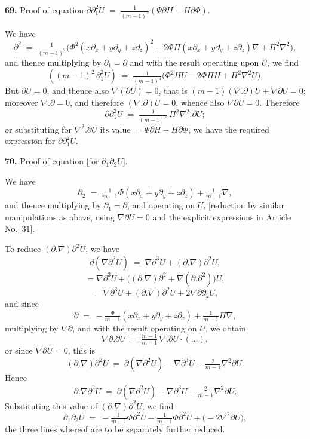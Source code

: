 \documentclass[11pt,a4paper]{article}
\begin{document}
\medskip

\textbf{69.} Proof of equation $\partial\partial_1^2 U \;=\; \tfrac{1}{(m-1)^2}(\Psi\partial H - H\partial\Phi).$

We have
\[
\partial^2 \;=\; \tfrac{1}{(m-1)^2}\bigl(\Phi^2(x\partial_x + y\partial_y + z\partial_z)^2 - 2\Phi\Pi(x\partial_x + y\partial_y + z\partial_z)\nabla + \Pi^2\nabla^2\bigr),
\]
and thence multiplying by $\partial_1 = \partial$ and with the result operating upon $U$, we find
\[
((m-1)^2\,\partial_1^2 U) \;=\; \tfrac{1}{(m-1)^4}\bigl(\Phi^2 H U - 2\Phi\Pi H + \Pi^2\nabla^2 U\bigr).
\]
But $\partial U = 0$, and thence also $\nabla(\partial U) = 0$, that is $(m-1)(\nabla.\partial)U + \nabla\partial U = 0$; moreover $\nabla.\partial = 0$, and therefore $(\nabla.\partial)U = 0$, whence also $\nabla\partial U = 0$. Therefore
\[
\partial\partial_1^2 U \;=\; \tfrac{1}{(m-1)^2}\,\Pi^2\nabla^2.\partial U;
\]
or substituting for $\nabla^2.\partial U$ its value $= \Psi\partial H - H\partial\Phi$, we have the required expression for $\partial\partial_1^2 U$.

\medskip

\textbf{70.} Proof of equation [for $\partial_1\partial_2 U$].

We have
\[
\partial_2 \;=\; \tfrac{1}{m-1}\Phi(x\partial_x + y\partial_y + z\partial_z) + \tfrac{1}{m-1}\nabla,
\]
and thence multiplying by $\partial_1 = \partial$, and operating on $U$,
[reduction by similar manipulations as above, using $\nabla\partial U = 0$ and the explicit expressions in Article No.~31].

To reduce $(\partial.\nabla)\partial^2 U$, we have
\[
\partial(\nabla\partial^2 U) \;=\; \nabla\partial^3 U + (\partial.\nabla)\partial^2 U,
\]
\[
= \nabla\partial^3 U + \bigl((\partial.\nabla)\partial^2 + \nabla(\partial.\partial^2)\bigr)U,
\]
\[
= \nabla\partial^3 U + (\partial.\nabla)\partial^2 U + 2\nabla\partial\partial_2 U,
\]
and since
\[
\partial \;=\; -\tfrac{\Phi}{m-1}(x\partial_x + y\partial_y + z\partial_z) + \tfrac{1}{m-1}\Pi\nabla,
\]
multiplying by $\nabla\partial$, and with the result operating on $U$, we obtain
\[
\nabla\partial.\partial U \;=\; \tfrac{m-1}{m-1}\,\nabla.\partial U\cdot(\ldots),
\]
or since $\nabla\partial U = 0$, this is
\[
(\partial.\nabla)\partial^2 U \;=\; \partial(\nabla\partial^2 U) - \nabla\partial^3 U - \tfrac{2}{m-1}\nabla^2\partial U.
\]
Hence
\[
\partial.\nabla\partial^2 U \;=\; \partial(\nabla\partial^2 U) - \nabla\partial^3 U - \tfrac{2}{m-1}\nabla^2\partial U.
\]
Substituting this value of $(\partial.\nabla)\partial^2 U$, we find
\[
\partial_1\partial_2 U \;=\; -\tfrac{1}{m-1}\Phi\partial^2 U - \tfrac{1}{m-1}\Phi\partial^2 U + \bigl(-2\nabla^2\partial U\bigr),
\]
the three lines whereof are to be separately further reduced.
\end{document}
